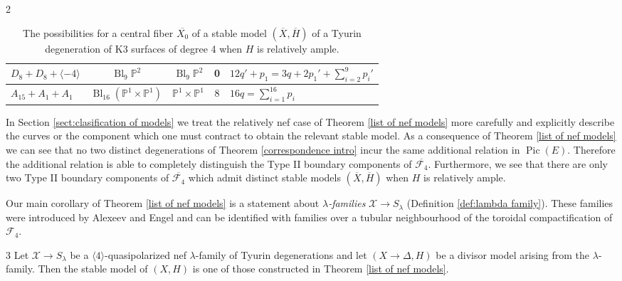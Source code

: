 \documentclass[a4paper]{amsart}
\theoremstyle{definition}
\theoremstyle{plain}
\theoremstyle{remark}
\newcommand{\PS}{\mathbb{P}}
\begin{document}
\begin{customthm}{2}
\begin{table}[h]
\begin{tabular}{|l|c|c|c|l|}
$D_8+D_8+\langle-4\rangle$             & $\operatorname{Bl}_9\PS^2$                 & $\operatorname{Bl}_9\PS^2$ & 0   & $12q'+p_1=3q+2p_1'+\sum_{i=2}^9p_i'$                                         \\ \hline
$A_{15}+A_1+A_1$                       & $\operatorname{Bl}_{16}(\PS^1\times\PS^1)$ & $\PS^1\times\PS^1$         & 8   & $16q=\sum_{i=1}^{16}p_i$                                                    \\ \hline
\end{tabular}
\caption{The possibilities for a central fiber $\overline{X_0}$ of a stable model $(\overline{X},\overline{H})$ of a Tyurin degeneration of K3 surfaces of degree 4 when $H$ is relatively ample.}
\label{Complete Description Table}
\end{table}
\end{customthm}

In Section \ref{sect:clasification of models} we treat the relatively nef case of Theorem \ref{list of nef models} more carefully and explicitly describe the curves or the component which one must contract to obtain the relevant stable model. As a consequence of Theorem \ref{list of nef models} we can see that no two distinct degenerations of Theorem \ref{correspondence intro} incur the same additional relation in $\operatorname{Pic}(E)$. Therefore the additional relation is able to completely distinguish the Type II boundary components of $\overline{\mathcal{F}_4}$. Furthermore, we see that there are only two Type II boundary components of $\overline{\mathcal{F}_4}$ which admit distinct stable models $\left(\overline{X},\overline{H}\right)$ when $H$ is relatively ample.

Our main corollary of Theorem \ref{list of nef models} is a statement about \emph{$\lambda$-families} $\mathcal{X}\rightarrow S_\lambda$ (Definition \ref{def:lambda family}). These families were introduced by Alexeev and Engel \cite{AE23} and can be identified with families over a tubular neighbourhood of the toroidal compactification of $\mathcal{F}_4$. 

\begin{customcor}{3}\label{thm:lambda families intro}
Let $\mathcal{X}\rightarrow S_\lambda$ be a $\langle 4 \rangle$-quasipolarized nef $\lambda$-family of Tyurin degenerations and let $(X\rightarrow\Delta,H)$ be a divisor model arising from the $\lambda$-family. Then the stable model of $(X,H)$ is one of those constructed in Theorem \ref{list of nef models}.
\end{customcor}
\end{document}
